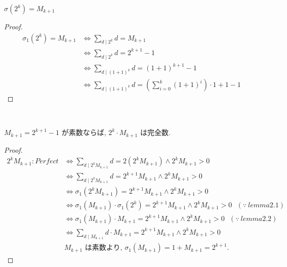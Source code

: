 \begin{lemma}\label{sigma_two_pow_eq_mersenne_succ}\leanok
{}
\(\sigma(2^k) = M_{k+1}\)

\end{lemma}

\begin{proof}
\begin{align*}
  \sigma_1(2^k) = M_{k+1} &\Leftrightarrow \sum_{d \mid 2^k} d = M_{k+1}\\
                          &\Leftrightarrow \sum_{d \mid 2^k} d = 2^{k+1} - 1\\
                          &\Leftrightarrow \sum_{d \mid (1+1)^k} d = (1+1)^{k+1} - 1\\
                          &\Leftrightarrow \sum_{d \mid (1+1)^k} d = (\sum_{i=0}^{k}(1+1)^i) \cdot 1 + 1 - 1
\end{align*}
\end{proof}


\begin{theorem}[Euclid I]\label{perfect_two_pow_mul_mersenne_of_prime}
\leanok
{}~\

\(M_{k+1} = 2^{k+1} - 1\) が素数ならば, \(2^k \cdot M_{k+1}\) は完全数.

\end{theorem}

\begin{proof}
\begin{align*}
2^kM_{k+1} : Perfect &\Leftrightarrow \sum_{d \mid 2^kM_{k+1}} d = 2(2^kM_{k+1}) \wedge 2^kM_{k+1} > 0\\
                     &\Leftrightarrow \sum_{d \mid 2^kM_{k+1}} d = 2^{k+1}M_{k+1} \wedge 2^kM_{k+1} > 0\\
                     &\Leftrightarrow \sigma_1(2^kM_{k+1}) = 2^{k+1}M_{k+1} \wedge 2^kM_{k+1} > 0\\
                     &\Leftrightarrow \sigma_1(M_{k+1}) \cdot \sigma_1(2^k) = 2^{k+1}M_{k+1} \wedge 2^kM_{k+1} > 0~~~(\because~lemma2.1)\\
                     &\Leftrightarrow \sigma_1(M_{k+1}) \cdot M_{k+1} = 2^{k+1}M_{k+1} \wedge 2^kM_{k+1} > 0~~~(\because~lemma2.2)\\
                     &\Leftrightarrow \sum_{d \mid M_{k+1}} d \cdot M_{k+1} = 2^{k+1}M_{k+1} \wedge 2^kM_{k+1} > 0\\
&\text{\(M_{k+1}\) は素数より, \(\sigma_1(M_{k+1}) = 1 + M_{k+1} = 2^{k+1}\).}
\end{align*}
\end{proof}


